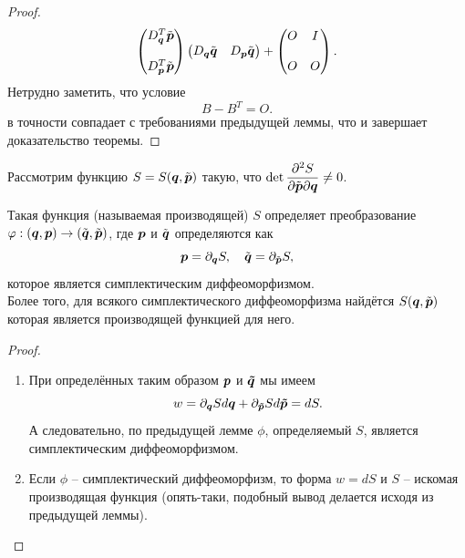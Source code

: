 \begin{proof}
\[\begin{pmatrix*}
            D_{\bt{q}}^T \tilde{\bt{p}} \\ \\ D_{\bt{p}}^T \tilde{\bt{p}}
        \end{pmatrix*} \begin{pmatrix*} D_{\bt{q}} \tilde{\bt{q}} & D_{\bt{p}} \tilde{\bt{q}}
        \end{pmatrix*} + \begin{pmatrix*} O & I \\ \\ O & O
        \end{pmatrix*}.
    \]
    Нетрудно заметить, что условие
    \[
        B - B^T = O.
    \]
    в точности совпадает с требованиями предыдущей леммы, что и завершает доказательство теоремы.
\end{proof}
Рассмотрим функцию $S = S(\boldsymbol{q}, \tilde{\boldsymbol{p}})$ такую, что $\det \dfrac{\partial^2 S}{\partial \tilde{\boldsymbol{p}} \partial \boldsymbol{q}} \neq 0$.
\begin{theorem}
    Такая функция (называемая производящей) $S$ определяет преобразование $\varphi: (\boldsymbol{q}, \boldsymbol{p}) \to (\tilde{\boldsymbol{q}}, \tilde{\boldsymbol{p}})$, где $\boldsymbol{p}$ и $\tilde{\boldsymbol{q}}$ определяются как
    \[
        \boldsymbol{p} = \partial_{\boldsymbol{q}} S, \quad \tilde{\boldsymbol{q}} = \partial_{\tilde{\boldsymbol{p}}} S,
    \]
    которое является симплектическим диффеоморфизмом. \\
    Более того, для всякого симплектического диффеоморфизма найдётся $S(\boldsymbol{q}, \tilde{\boldsymbol{p}})$ которая является производящей функцией для него.
\end{theorem}
\begin{proof} \leavevmode
    \begin{enumerate}
        \item При определённых таким образом $\boldsymbol{p}$ и $\boldsymbol{\tilde{q}}$ мы имеем
        \[
            w = \partial_{\boldsymbol{q}} S d\boldsymbol{q} + \partial_{\boldsymbol{\tilde{p}}} Sd\boldsymbol{\tilde{p}} = dS.
        \]
        А следовательно, по предыдущей лемме $\phi$, определяемый $S$, является симплектическим диффеоморфизмом.
        \item Если $\phi$ -- симплектический диффеоморфизм, то форма $w = dS$ и $S$ -- искомая производящая функция (опять-таки, подобный вывод делается исходя из предыдущей леммы).
    \end{enumerate}
\end{proof}
